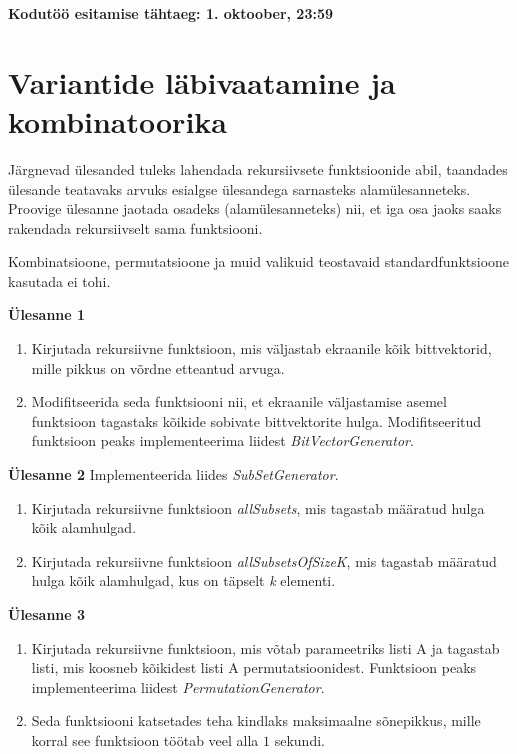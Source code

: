 \documentclass[a4paper]{article}
\begin{document}
\textbf{Kodutöö esitamise tähtaeg: 1. oktoober, 23:59}

\section*{Variantide läbivaatamine ja kombinatoorika}

Järgnevad ülesanded tuleks lahendada rekursiivsete funktsioonide abil,
taandades ülesande teatavaks arvuks esialgse ülesandega sarnasteks
alamülesanneteks. Proovige ülesanne jaotada osadeks (alamülesanneteks)
nii, et iga osa jaoks saaks rakendada rekursiivselt sama funktsiooni.

Kombinatsioone, permutatsioone ja muid valikuid teostavaid standardfunktsioone kasutada ei tohi.

\begin{problem}
\textbf{Ülesanne 1}
\begin{enumerate}
\item 
Kirjutada rekursiivne funktsioon, mis väljastab ekraanile kõik
bittvektorid, mille pikkus on võrdne etteantud arvuga.
\item
Modifitseerida seda funktsiooni nii, et ekraanile väljastamise asemel funktsioon tagastaks kõikide sobivate bittvektorite hulga. Modifitseeritud funktsioon peaks implementeerima liidest \textit{BitVectorGenerator}.
\end{enumerate}
\end{problem}

\begin{problem}
\textbf{Ülesanne 2}
\newline
Implementeerida liides \textit{SubSetGenerator}.
\begin{enumerate}
\item
Kirjutada rekursiivne funktsioon \textit{allSubsets}, mis tagastab määratud hulga kõik alamhulgad.
\item
Kirjutada rekursiivne funktsioon \textit{allSubsetsOfSizeK}, mis tagastab määratud hulga kõik alamhulgad, kus on täpselt \textit{k} elementi.
\end{enumerate}
\end{problem}

\begin{problem}
\textbf{Ülesanne 3}
\begin{enumerate}
\item
Kirjutada rekursiivne funktsioon, mis võtab parameetriks listi A ja tagastab listi, mis koosneb kõikidest listi A permutatsioonidest.
Funktsioon peaks implementeerima liidest \textit{PermutationGenerator}.
\item
Seda funktsiooni katsetades teha kindlaks maksimaalne sõnepikkus, mille korral see funktsioon töötab veel alla $1$
sekundi.
\end{enumerate}
\end{problem}
\end{document}
